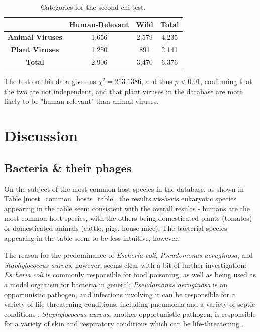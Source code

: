 \documentclass[12pt]{article}
\begin{document}
    \begin{table}[H]
        \begin{center}
            \begin{tabular}{|c|c|c|c|}
                \hline
                                        & \textbf{Human-Relevant} & \textbf{Wild} & \textbf{Total} \\ \hline
                \textbf{Animal Viruses} & 1,656                   & 2,579         & 4,235          \\ \hline
                \textbf{Plant Viruses}  & 1,250                   & 891           & 2,141          \\ \hline
                \textbf{Total}          & 2,906                   & 3,470         & 6,376          \\ \hline
            \end{tabular}
        \end{center}
        \caption{Categories for the second chi test.}
        \label{plants_animals_chi_test}
    \end{table}

    The test on this data gives us $\chi^2 = 213.1386$, and thus $p < 0.01$,
    confirming that the two are not independent, and that plant viruses in the
    database are more likely to be "human-relevant" than animal viruses.
        
    \section{Discussion}

    \subsection{Bacteria \& their phages}

    On the subject of the most common host species in the database, as shown in
    Table \ref{most_common_hosts_table}, the results vis-à-vis eukaryotic species
    appearing in the table seem consistent with the overall results - humans are
    the most common host species, with the others being domesticated plants
    (tomatos) or domesticated animals (cattle, pigs, house mice). The bacterial
    species appearing in the table seem to be less intuitive, however.

    The reason for the predominance of \emph{Escheria coli}, \emph{Pseudomonas
    aeruginosa}, and \emph{Staphylococcus aureus}, however, seems clear with
    a bit of further investigation: \emph{Escheria coli} is commonly responsible
    for food poisoning, as well as being used as a model organism for bacteria
    in general; \emph{Pseudomonas aeruginosa} is an opportunistic pathogen, and
    infections involving it can be responsible for a variety of life-threatening
    conditions, including pneumonia and a variety of septic conditions \cite{pseudomonas};
    \emph{Staphylococcus aureus}, another opportunistic pathogen, is responsible
    for a variety of skin and respiratory conditions which can be life-threatening
    \cite{staph}.
\end{document}
